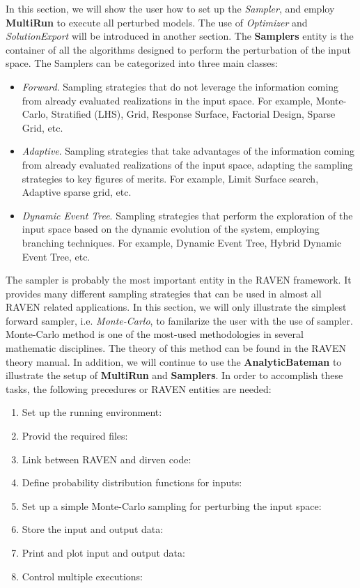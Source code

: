 In this section, we will show the user how to set up the \textit{Sampler}, and employ \textbf{MultiRun} to execute
all perturbed models. The use of \textit{Optimizer} and \textit{SolutionExport} will be introduced in another section.
The \textbf{Samplers}  entity is the container of all the algorithms designed to perform the perturbation of the
input space. The Samplers can be categorized into three main classes:

\begin{itemize}
  \item  \textit{Forward}. Sampling strategies that do not leverage the information coming from already evaluated
    realizations in the input space. For example, Monte-Carlo, Stratified (LHS), Grid, Response Surface, Factorial Design,
    Sparse Grid, etc.
  \item  \textit{Adaptive}. Sampling strategies that take advantages of the information coming from already evaluated
    realizations of the input space, adapting the sampling strategies to key figures of merits. For example, Limit Surface
    search, Adaptive sparse grid, etc.
  \item \textit{Dynamic Event Tree}. Sampling strategies that perform the exploration of the input space based on the
    dynamic evolution of the system, employing branching techniques. For example, Dynamic Event Tree, Hybrid
    Dynamic Event Tree, etc.
\end{itemize}

The sampler is probably the most important entity in the RAVEN framework. It provides many different sampling
strategies that can be used in almost all RAVEN related applications. In this section, we will only illustrate
the simplest forward sampler, i.e. \textit{Monte-Carlo}, to familarize the user with the use of sampler. Monte-Carlo method
is one of the most-used methodologies in several mathematic disciplines. The theory of this method can be found in
the RAVEN theory manual. In addition, we will continue to use the \textbf{AnalyticBateman} to illustrate the setup
of \textbf{MultiRun} and \textbf{Samplers}. In order to accomplish these tasks, the following precedures or RAVEN
entities are needed:

\begin{enumerate}
  \item Set up the running environment: 
  \item Provid the required files: 
  \item Link between RAVEN and dirven code: 
  \item Define probability distribution functions for inputs: 
  \item Set up a simple Monte-Carlo sampling for perturbing the input space: 
  \item Store the input and output data: 
  \item Print and plot input and output data: 
  \item Control multiple executions: 
\end{enumerate}


